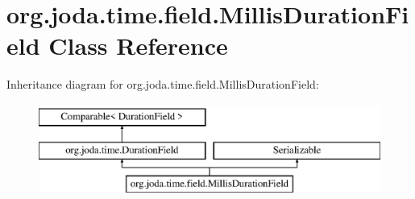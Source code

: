 \hypertarget{classorg_1_1joda_1_1time_1_1field_1_1_millis_duration_field}{\section{org.\-joda.\-time.\-field.\-Millis\-Duration\-Field Class Reference}
\label{classorg_1_1joda_1_1time_1_1field_1_1_millis_duration_field}
}
Inheritance diagram for org.\-joda.\-time.\-field.\-Millis\-Duration\-Field\-:\begin{figure}[H]
\begin{center}
\leavevmode
\includegraphics[height=3.000000cm]{classorg_1_1joda_1_1time_1_1field_1_1_millis_duration_field}
\end{center}
\end{figure}
